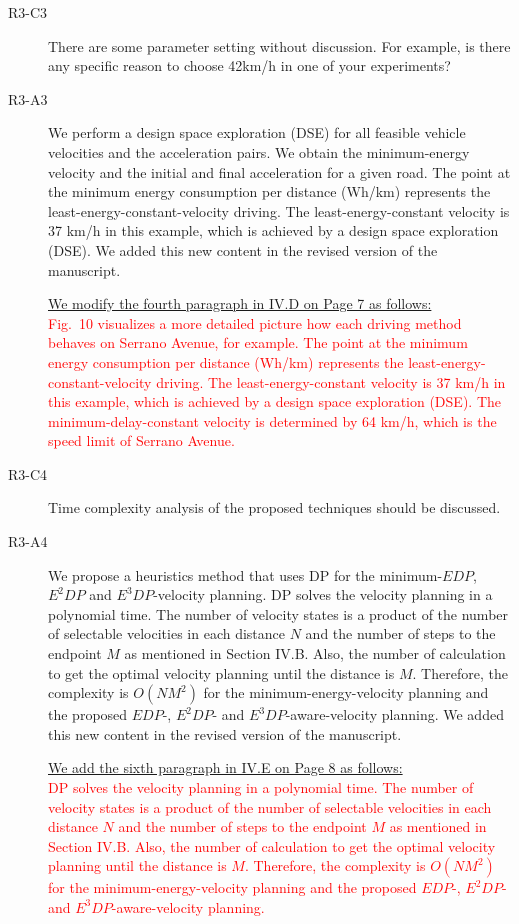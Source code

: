 \documentclass[onecolumn]{IEEEconf}
\begin{document}
\begin{description}
\item [R3-C3] There are some parameter setting without discussion. For example, is there any specific reason to choose 42km/h in one of your experiments?

\item [R3-A3] We perform a design space exploration (DSE) for all feasible vehicle velocities and the acceleration pairs. We obtain the minimum-energy velocity and the initial and final acceleration for a given road. The point at the minimum energy consumption per distance (Wh/km) represents the least-energy-constant-velocity driving. The least-energy-constant velocity is 37 km/h in this example, which is achieved by a design space exploration (DSE). We added this new content in the revised version of the manuscript. 

\uline{We modify the fourth paragraph in IV.D on Page 7 as follows:}\\
\textcolor{red}{
Fig.~10 visualizes a more detailed picture how each driving method behaves on Serrano Avenue, for example. 
The point at the minimum energy consumption per distance (Wh/km) represents the least-energy-constant-velocity driving. The least-energy-constant velocity is 37 km/h in this example, which is achieved by a design space exploration (DSE). The minimum-delay-constant velocity is determined by 64 km/h, which is the speed limit of Serrano Avenue.}

\item [R3-C4] Time complexity analysis of the proposed techniques should be discussed.

\item [R3-A4] We propose a heuristics method that uses DP for the minimum-$EDP$, $E^2DP$ and $E^3DP$-velocity planning. DP solves the velocity planning in a polynomial time. The number of velocity states is a product of the number of selectable velocities in each distance $N$ and the number of steps to the endpoint $M$ as mentioned in Section IV.B. Also, the number of calculation to get the optimal velocity planning until the distance is $M$. Therefore, the complexity is $O(NM^2)$ for the minimum-energy-velocity planning and the proposed $EDP$-, $E^2DP$- and $E^3DP$-aware-velocity planning. We added this new content in the revised version of the manuscript. 
 
\uline{We add the sixth paragraph in IV.E on Page 8 as follows:}\\
\textcolor{red}{DP solves the velocity planning in a polynomial time. The number of velocity states is a product of the number of selectable velocities in each distance $N$ and the number of steps to the endpoint $M$ as mentioned in Section IV.B. Also, the number of calculation to get the optimal velocity planning until the distance is $M$. Therefore, the complexity is $O(NM^2)$ for the minimum-energy-velocity planning and the proposed $EDP$-, $E^2DP$- and $E^3DP$-aware-velocity planning.} 


\end{description}
\end{document}
